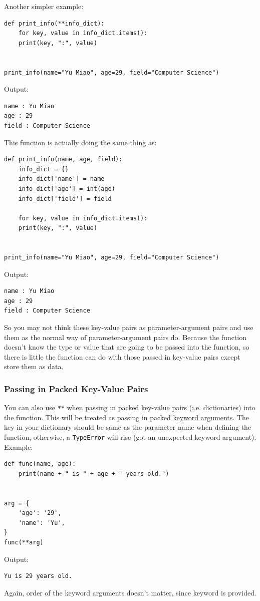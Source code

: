 \documentclass[12pt]{book}
\begin{document}
Another simpler example:
\begin{verbatim}
def print_info(**info_dict):
    for key, value in info_dict.items():
	print(key, ":", value)


print_info(name="Yu Miao", age=29, field="Computer Science")
\end{verbatim}
Output:
\begin{verbatim}
name : Yu Miao
age : 29
field : Computer Science
\end{verbatim}
This function is actually doing the same thing as:
\begin{verbatim}
def print_info(name, age, field):
    info_dict = {}
    info_dict['name'] = name
    info_dict['age'] = int(age)
    info_dict['field'] = field

    for key, value in info_dict.items():
	print(key, ":", value)


print_info(name="Yu Miao", age=29, field="Computer Science")
\end{verbatim}
Output:
\begin{verbatim}
name : Yu Miao
age : 29
field : Computer Science
\end{verbatim}

So you may not think these key-value pairs as parameter-argument pairs and use them as the normal way of parameter-argument pairs do. Because the function doesn't know the type or value that are going to be passed into the function, so there is little the function can do with those passed in key-value pairs except store them as data.
\subsubsection{Passing in Packed Key-Value Pairs}
\label{sec:org36cb106}
You can also use \texttt{**} when passing in packed key-value pairs (i.e. dictionaries) into the function. This will be treated as passing in packed \hyperref[orge9952c7]{keyword arguments}. The key in your dictionary should be same as the parameter name when defining the function, otherwise, a \texttt{TypeError} will rise (got an unexpected keyword argument). Example:
\begin{verbatim}
def func(name, age):
    print(name + " is " + age + " years old.")


arg = {
    'age': '29',
    'name': 'Yu',
}
func(**arg)
\end{verbatim}
Output:
\begin{verbatim}
Yu is 29 years old.
\end{verbatim}
Again, order of the keyword arguments doesn't matter, since keyword is provided.
\end{document}
